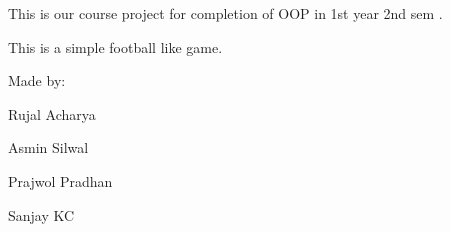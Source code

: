 This is our course project for completion of OOP in 1st year 2nd sem .

This is a simple football like game.

Made by\+:

Rujal Acharya

Asmin Silwal

Prajwol Pradhan

Sanjay KC 